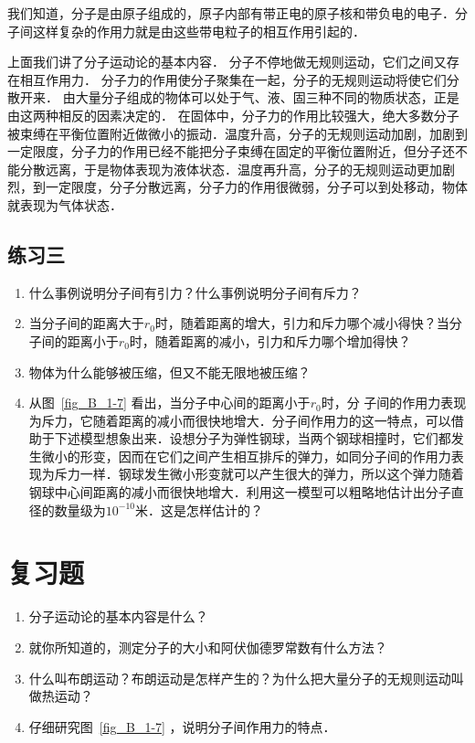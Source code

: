 我们知道，分子是由原子组成的，原子内部有带正电的原子核和带负电的电子．分子间这样复杂的作用力就是由这些带电粒子的相互作用引起的．

上面我们讲了分子运动论的基本内容．
分子不停地做无规则运动，它们之间又存在相互作用力．
分子力的作用使分子聚集在一起，分子的无规则运动将使它们分散开来．
由大量分子组成的物体可以处于气、液、固三种不同的物质状态，正是由这两种相反的因素决定的．
在固体中，分子力的作用比较强大，绝大多数分子被束缚在平衡位置附近做微小的振动．温度升高，分子的无规则运动加剧，加剧到一定限度，分子力的作用已经不能把分子束缚在固定的平衡位置附近，但分子还不能分散远离，于是物体表现为液体状态．温度再升高，分子的无规则运动更加剧烈，到一定限度，分子分散远离，分子力的作用很微弱，分子可以到处移动，物体就表现为气体状态．

\subsection*{练习三}
\begin{enumerate}
	\item 什么事例说明分子间有引力？什么事例说明分子间有斥力？
	\item 当分子间的距离大于$r_0$时，随着距离的增大，引力和斥力哪个减小得快？当分子间的距离小于$r_0$时，随着距离的减小，引力和斥力哪个增加得快？
	\item 物体为什么能够被压缩，但又不能无限地被压缩？
\item	从图~\ref{fig_B_1-7} 看出，当分子中心间的距离小于$r_0$时，分
子间的作用力表现为斥力，它随着距离的减小而很快地增大．分子间作用力的这一特点，可以借助于下述模型想象出来．设想分子为弹性钢球，当两个钢球相撞时，它们都发生微小的形变，因而在它们之间产生相互排斥的弹力，如同分子间的作用力表现为斥力一样．钢球发生微小形变就可以产生很大的弹力，所以这个弹力随着钢球中心间距离的减小而很快地增大．利用这一模型可以粗略地估计出分子直径的数量级为$10^{-10}$米．这是怎样估计的？

\end{enumerate}

\section*{复习题}
\begin{enumerate}
\item 分子运动论的基本内容是什么？
\item 就你所知道的，测定分子的大小和阿伏伽德罗常数有什么方法？
\item 什么叫布朗运动？布朗运动是怎样产生的？为什么把大量分子的无规则运动叫做热运动？
\item 仔细研究图~\ref{fig_B_1-7} ，说明分子间作用力的特点．
\end{enumerate}






